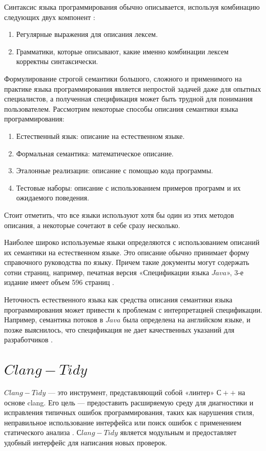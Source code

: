 \documentclass{mipt-thesis-bs}
\begin{document}
Синтаксис языка программирования обычно описывается, используя комбинацию следующих двух компонент \cite{tsspec}:
\begin{enumerate}
    \item Регулярные выражения для описания лексем.
    \item Грамматики, которые описывают, какие именно комбинации лексем
    корректны синтаксически.
\end{enumerate}

Формулирование строгой семантики большого, сложного и применимого на практике языка 
программирования является непростой задачей даже для опытных специалистов, 
а полученная спецификация может быть трудной для понимания пользователем.
Рассмотрим некоторые способы описания семантики языка 
программирования:
\begin{enumerate}
    \item Естественный язык: описание на естественном языке.
    \item Формальная семантика: математическое описание.
    \item Эталонные реализации: описание с помощью кода программы.
    \item Тестовые наборы: описание с использованием примеров программ
    и их ожидаемого поведения.
\end{enumerate}

Стоит отметить, что все языки используют хотя бы один из этих методов 
описания, а некоторые сочетают в себе сразу несколько.

Наиболее широко используемые языки определяются с использованием описаний 
их семантики на естественном языке. Это описание обычно принимает форму 
справочного руководства по языку. Причем такие документы могут содержать сотни 
страниц, например, печатная версия
«Спецификации языка $Java$», 3-е издание имеет объем 596 страниц \cite{js-spec}.

Неточность естественного языка как средства описания семантики 
языка программирования может привести к проблемам с интерпретацией 
спецификации. Например, семантика потоков в $Java$ была определена на
английском языке, и позже выяснилось, что спецификация не дает 
качественных указаний для разработчиков \cite{jvm-spec}.

\section{$Clang-Tidy$}

$Clang-Tidy$ — это инструмент, представляющий собой «линтер» $С++$ на основе clang.
Его цель — предоставить расширяемую среду для диагностики и 
исправления типичных ошибок 
программирования, таких как нарушения стиля, неправильное использование 
интерфейса или поиск ошибок с применением статического 
анализа \cite{clang-tidy}. $Сlang-Tidy$ является модульным и предоставляет удобный
интерфейс для написания новых проверок.
\end{document}
